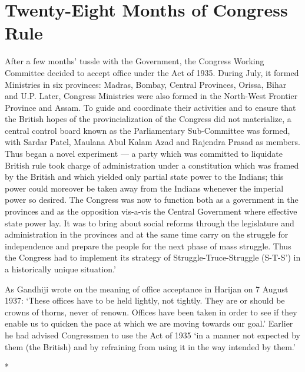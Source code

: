 
\chapter{Twenty-Eight Months of Congress Rule}



After a few months' tussle with the Government, the Congress Working Committee decided to accept office under the Act of 1935. During July, it formed Ministries in six provinces: Madras, Bombay, Central Provinces, Orissa, Bihar and U.P. Later, Congress Ministries were also formed in the North-West Frontier Province and Assam. To guide and coordinate their activities and to ensure that the British hopes of the provincialization of the Congress did not materialize, a central control board known as the Parliamentary Sub-Committee was formed, with Sardar Patel, Maulana Abul Kalam Azad and Rajendra Prasad as members. Thus began a novel experiment --- a party which was committed to liquidate British rule took charge of administration under a constitution which was framed by the British and which yielded only partial state power to the Indians; this power could moreover be taken away from the Indians whenever the imperial power so desired. The Congress was now to function both as a government in the provinces and as the opposition vis-a-vis the Central Government where effective state power lay. It was to bring about social reforms through the legislature and administration in the provinces and at the same time carry on the struggle for independence and prepare the people for the next phase of mass struggle. Thus the Congress had to implement its strategy of Struggle-Truce-Struggle (S-T-S') in a historically unique situation.' 

As Gandhiji wrote on the meaning of office acceptance in Harijan on 7 August 1937: `These offices have to be held lightly, not tightly. They are or should be crowns of thorns, never of renown. Offices have been taken in order to see if they enable us to quicken the pace at which we are moving towards our goal.' Earlier he had advised Congressmen to use the Act of 1935 `in a manner not expected by them (the British) and by refraining from using it in the way intended by them.'

\begin{center}*\end{center}

\paragraph*{}


